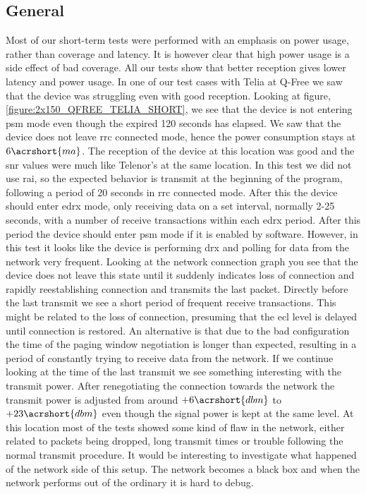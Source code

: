 \documentclass[USenglish]{ifimaster}  %
\begin{document}
\subsection{General} \label{ssection:generaltest}
Most of our short-term tests were performed with an emphasis on power usage, rather than coverage and latency. It is however clear that high power usage is a side effect of bad coverage. All our tests show that better reception gives lower latency and power usage. In one of our test cases with Telia at Q-Free we saw that the device was struggling even with good reception. Looking at figure, \vref{figure:2x150_QFREE_TELIA_SHORT}, we see that the device is not entering \acrshort{psm} mode even though the expired 120 seconds has elapsed. We saw that the device does not leave \acrshort{rrc} connected mode, hence the power consumption stays at ${6 \acrshort{ma}}$. The reception of the device at this location was good and the \acrshort{snr} values were much like Telenor's at the same location. In this test we did not use \acrshort{rai}, so the expected behavior is transmit at the beginning of the program, following a period of 20 seconds in \acrshort{rrc} connected mode. After this the device should enter \acrshort{edrx} mode, only receiving data on a set interval, normally 2-25 seconds, with a number of receive transactions within each \acrshort{edrx} period. After this period the device should enter \acrshort{psm} mode if it is enabled by software. However, in this test it looks like the device is performing \acrshort{drx} and polling for data from the network very frequent. Looking at the network connection graph you see that the device does not leave this state until it suddenly indicates loss of connection and rapidly reestablishing connection and transmits the last packet. Directly before the last transmit we see a short period of frequent receive transactions. This might be related to the loss of connection, presuming that the \acrshort{ecl} level is delayed until connection is restored. An alternative is that due to the bad configuration the time of the paging window negotiation is longer than expected, resulting in a period of constantly trying to receive data from the network. If we continue looking at the time of the last transmit we see something interesting with the transmit power. After renegotiating the connection towards the network the transmit power is adjusted from around ${+6 \acrshort{dbm}}$ to ${+23 \acrshort{dbm}}$ even though the signal power is kept at the same level. At this location most of the tests showed some kind of flaw in the network, either related to packets being dropped, long transmit times or trouble following the normal transmit procedure. It would be interesting to investigate what happened of the network side of this setup. The network becomes a black box and when the network performs out of the ordinary it is hard to debug.
\end{document}
